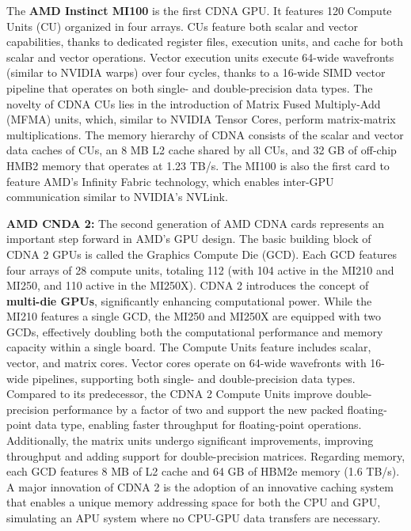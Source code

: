 The \textbf{AMD Instinct MI100} is the first CDNA GPU.
It features 120 Compute Units (CU) organized in four arrays. CUs feature both scalar and vector capabilities, thanks to dedicated register files, execution units, and cache for both scalar and vector operations. Vector execution units execute 64-wide wavefronts (similar to NVIDIA warps) over four cycles, thanks to a 16-wide SIMD vector pipeline that operates on both single- and double-precision data types.
The novelty of CDNA CUs lies in the introduction of Matrix Fused Multiply-Add (MFMA) units, which, similar to NVIDIA Tensor Cores, perform matrix-matrix multiplications.
The memory hierarchy of CDNA consists of the scalar and vector data caches of CUs, an 8 MB L2 cache shared by all CUs, and 32 GB of off-chip HMB2 memory that operates at 1.23 TB/s.
The MI100 is also the first card to feature AMD's Infinity Fabric technology, which enables inter-GPU communication similar to NVIDIA's NVLink.

\textbf{AMD CNDA 2:} The second generation of AMD CDNA cards represents an important step forward in AMD's GPU design.
The basic building block of CDNA 2 GPUs is called the Graphics Compute Die (GCD). Each GCD features four arrays of 28 compute units, totaling 112 (with 104 active in the MI210 and MI250, and 110 active in the MI250X). CDNA 2 introduces the concept of \textbf{multi-die GPUs}, significantly enhancing computational power. While the MI210 features a single GCD, the MI250 and MI250X are equipped with two GCDs, effectively doubling both the computational performance and memory capacity within a single board.
The Compute Units feature includes scalar, vector, and matrix cores. Vector cores operate on 64-wide wavefronts with 16-wide pipelines, supporting both single- and double-precision data types. Compared to its predecessor, the CDNA 2 Compute Units improve double-precision performance by a factor of two and support the new packed floating-point data type, enabling faster throughput for floating-point operations. Additionally, the matrix units undergo significant improvements, improving throughput and adding support for double-precision matrices.
Regarding memory, each GCD features 8 MB of L2 cache and 64 GB of HBM2e memory (1.6 TB/s).
A major innovation of CDNA 2 is the adoption of an innovative caching system that enables a unique memory addressing space for both the CPU and GPU, simulating an APU system where no CPU-GPU data transfers are necessary. 

